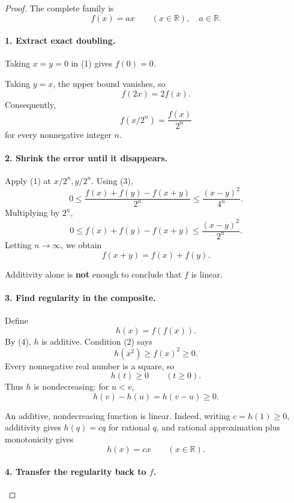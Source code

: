 
\begin{dlsummary}[title={\bfseries Solution 56. The Microscopic Error Trap},breakable]

\begin{proof}
The complete family is
\[
\boxed{f(x)=ax\qquad(x\in\mathbb R),\quad a\in\mathbb R.}
\]

\paragraph{1. Extract exact doubling.}

Taking \(x=y=0\) in (1) gives \(f(0)=0\).

Taking \(y=x\), the upper bound vanishes, so
\[
\boxed{f(2x)=2f(x).} \tag{3}
\]
Consequently,
\[
f(x/2^n)=\frac{f(x)}{2^n}
\]
for every nonnegative integer \(n\).

\paragraph{2. Shrink the error until it disappears.}

Apply (1) at \(x/2^n,y/2^n\). Using (3),
\[
0\le
\frac{f(x)+f(y)-f(x+y)}{2^n}
\le\frac{(x-y)^2}{4^n}.
\]
Multiplying by \(2^n\),
\[
0\le f(x)+f(y)-f(x+y)
\le\frac{(x-y)^2}{2^n}.
\]
Letting \(n\to\infty\), we obtain
\[
\boxed{f(x+y)=f(x)+f(y).} \tag{4}
\]

Additivity alone is \textbf{not} enough to conclude that \(f\) is linear.

\paragraph{3. Find regularity in the composite.}

Define
\[
h(x)=f(f(x)).
\]
By (4), \(h\) is additive. Condition (2) says
\[
h(x^2)\ge f(x)^2\ge0.
\]
Every nonnegative real number is a square, so
\[
h(t)\ge0\qquad(t\ge0).
\]
Thus \(h\) is nondecreasing: for \(u<v\),
\[
h(v)-h(u)=h(v-u)\ge0.
\]

An additive, nondecreasing function is linear. Indeed, writing \(c=h(1)\ge0\), additivity gives \(h(q)=cq\) for rational \(q\), and rational approximation plus monotonicity gives
\[
\boxed{h(x)=cx\qquad(x\in\mathbb R).} \tag{5}
\]

\paragraph{4. Transfer the regularity back to \(f\).}


\end{proof}
\end{dlsummary}

